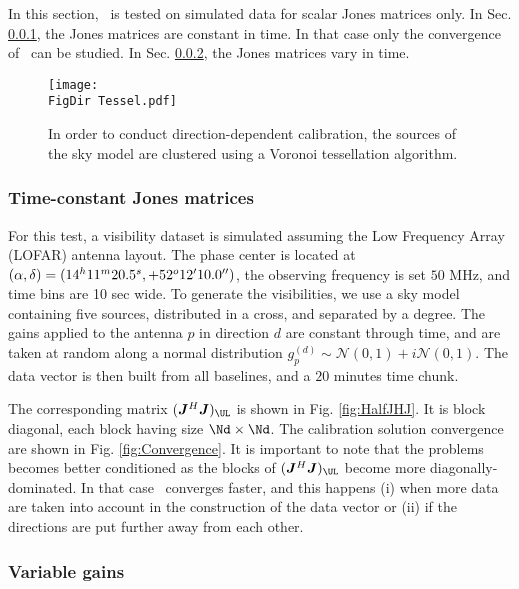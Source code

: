 

In this section, \COH\ is tested on simulated data for scalar Jones
matrices only. In Sec. \ref{sec:SimpleSimul}, the
Jones matrices are constant in time. In that case only the convergence
of \COH\ can be studied. In Sec. \ref{sec:VarSimul}, the Jones matrices vary in
time.

\begin{figure}
\begin{center}
\texttt{[image: \\FigDir Tessel.pdf]}
\caption{\label{fig:tessel} In order to conduct direction-dependent
  calibration, the sources of the sky model are clustered using a Voronoi
  tessellation algorithm.}
\end{center}
\end{figure}

\subsubsection{Time-constant Jones matrices}
\label{sec:SimpleSimul}

For this test, a visibility dataset is simulated assuming the Low Frequency Array (LOFAR) antenna
layout. The phase center is located at
$(\alpha,\delta)=(14^h11^m20.5^s, +52^{o}12\hbox{$^\prime$}10.0\hbox{$^{\prime\prime}$})$,
the observing frequency is set $50$ MHz, and time
bins are 10 sec wide. To generate the visibilities, we use a sky model containing five
sources, distributed in a cross, and separated by a degree. The gains
applied to the antenna $p$ in direction $d$ are
constant through time, and are taken at random along a normal distribution
$g^{(d)}_{p}\sim\mathcal{N}\left(0,1\right)+i\mathcal{N}\left(0,1\right)$. The
data vector is then built from all baselines, and a $20$ minutes time chunk.

The corresponding matrix $(\JHJ)_\UL$ is shown in
Fig. \ref{fig:HalfJHJ}. It is block diagonal, each block having size
$\Nd\times\Nd$. The calibration solution convergence are shown
in Fig. \ref{fig:Convergence}. It is important to note that the
problems becomes better conditioned as the blocks of $(\JHJ)_\UL$
become more diagonally-dominated. In that case \COH\ converges faster, 
and this happens (i) when more data are taken into
account in the construction of the data vector or (ii) if the
directions are put further away from each other.

\subsubsection{Variable gains}
\label{sec:VarSimul}

